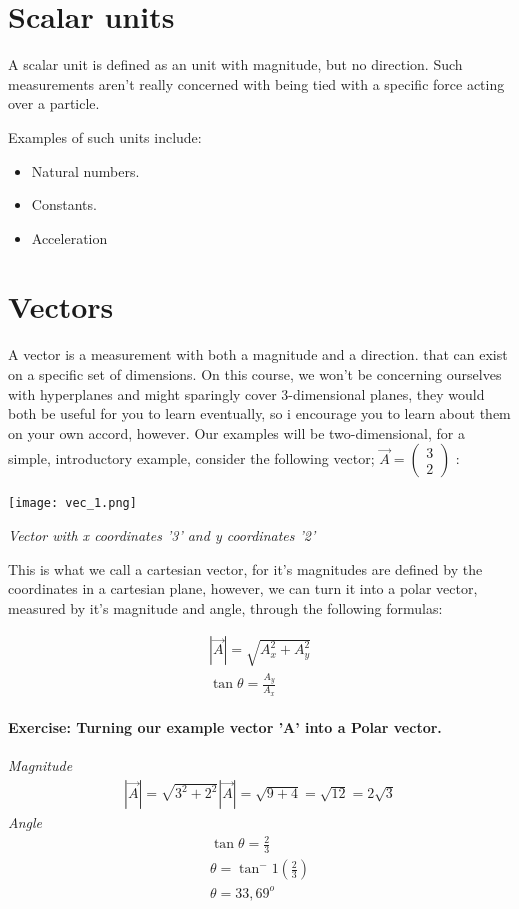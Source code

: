 \documentclass[11pt,fleqn]{book} %
\begin{document}
\section{Scalar units}

A scalar unit is defined as an unit with magnitude, but no direction. Such measurements
aren't really concerned with being tied with a specific force acting over a particle. 

Examples of such units include:
\begin{itemize}
    \item Natural numbers.
    \item Constants.
    \item Acceleration
\end{itemize}

\section{Vectors}

A vector is a measurement with both a magnitude and a direction. that can exist on
a specific set of dimensions. On this course, we won't be concerning ourselves with hyperplanes
and might sparingly cover 3-dimensional planes, they would both be useful for you to learn eventually, so i encourage
you to learn about them on your own accord, however. Our examples will be two-dimensional, for a simple, 
introductory example, consider the following vector; $ \vec{A} = 
\begin{pmatrix}
    3 \\
    2
\end{pmatrix} $ :

\begin{center}
 \texttt{[image: vec\_1.png]}

 \textit{Vector with x coordinates '3' and y coordinates '2'}
\end{center}


This is what we call a cartesian vector, for it's magnitudes are defined by the coordinates in a
cartesian plane, however, we can turn it into a polar vector, measured by it's magnitude and 
angle, through the following formulas:

\begin{gather}
    |\vec{A}| = \sqrt{A_x^2+A_y^2} \\
    \tan \theta = \frac{A_y}{A_x}
\end{gather}

\paragraph{Exercise: Turning our example vector 'A' into a Polar vector.}
\textit{Magnitude}
\begin{gather}
    |\vec{A}| = \sqrt{3^2+2^2}
    |\vec{A}| = \sqrt{9+4} = \sqrt{12} = 2\sqrt{3} 
\end{gather}
\textit{Angle}
\begin{gather}
    \tan \theta = \frac{2}{3} \\
    \theta = \tan^-1(\frac{2}{3}) \\
    \theta = 33,69^o 
\end{gather}
\end{document}
